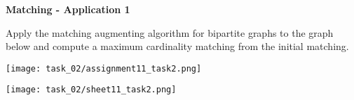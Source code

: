 \question \textbf{Matching - Application 1}

Apply the matching augmenting algorithm for bipartite graphs to the graph below and compute a maximum cardinality matching from the initial matching.

\texttt{[image: task\_02/assignment11\_task2.png]}

\begin{solution}
    
    \texttt{[image: task\_02/sheet11\_task2.png]}
\end{solution}